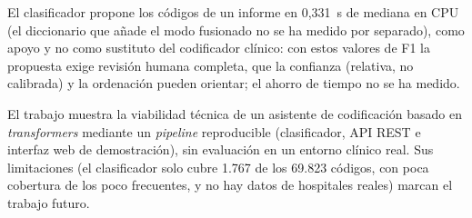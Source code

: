 \begin{resumenPral}[spanish]{\titulo}
El clasificador propone los códigos de un informe en 0,331~s de mediana en CPU (el diccionario que añade el modo fusionado no se ha medido por separado), como apoyo y no como sustituto del codificador clínico: con estos valores de F1 la propuesta exige revisión humana completa, que la confianza (relativa, no calibrada) y la ordenación pueden orientar; el ahorro de tiempo no se ha medido.

El trabajo muestra la viabilidad técnica de un asistente de codificación basado en \emph{transformers} mediante un \emph{pipeline} reproducible (clasificador, API REST e interfaz web de demostración), sin evaluación en un entorno clínico real. Sus limitaciones (el clasificador solo cubre 1.767 de los 69.823 códigos, con poca cobertura de los poco frecuentes, y no hay datos de hospitales reales) marcan el trabajo futuro.
\end{resumenPral}


